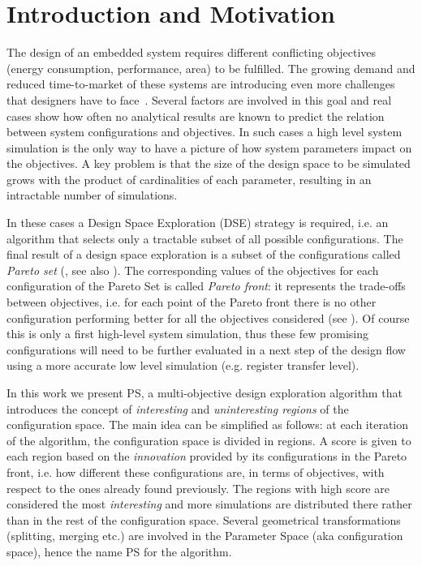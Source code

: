 
\section{Introduction and Motivation}

The design of an embedded system requires different conflicting
objectives (energy consumption, performance, area) to be fulfilled.
The growing demand and reduced time-to-market of these systems are
introducing even more challenges that designers have to
face~\cite{wsts}.
Several factors are involved in this goal and real cases show how
often no analytical results are known to predict the relation between
system configurations and objectives. In such cases a high level
system simulation is the only way to have a picture of how system
parameters impact on the objectives.  A key problem is that the size
of the design space to be simulated grows with the product of
cardinalities of each parameter, resulting in an intractable number
of simulations. 

In these cases a Design Space Exploration (DSE) strategy is required,
i.e. an algorithm that selects only a tractable subset of all possible
configurations.  The final result of a design space exploration is a
subset of the configurations called \emph{Pareto set} (\cite{pareto},
see also ). The corresponding values of the
objectives for each configuration of the Pareto Set is called
\emph{Pareto front}: it represents the trade-offs between objectives,
i.e.  for each point of the Pareto front there is no other
configuration performing better for all the objectives considered (see
). Of course this is only a first high-level system
simulation, thus these few promising configurations will need to be
further evaluated in a next step of the design flow using a more
accurate low level simulation (e.g. register transfer level).



In this work we present PS, a multi-objective design exploration
algorithm that introduces the concept of \emph{interesting} and
\emph{uninteresting regions} of the configuration space.  The main
idea can be simplified as follows: at each iteration of the algorithm,
the configuration space is divided in regions. A score is given to
each region based on the \emph{innovation} provided by its
configurations in the Pareto front, i.e. how different these configurations are, in terms of objectives, with respect to the ones already found previously. The regions with high score are considered the most \emph{interesting} and more simulations are distributed there rather than in the rest of the configuration space.
Several geometrical transformations (splitting, merging etc.) are
involved in the Parameter Space (aka configuration space), hence
the name PS for the algorithm.

